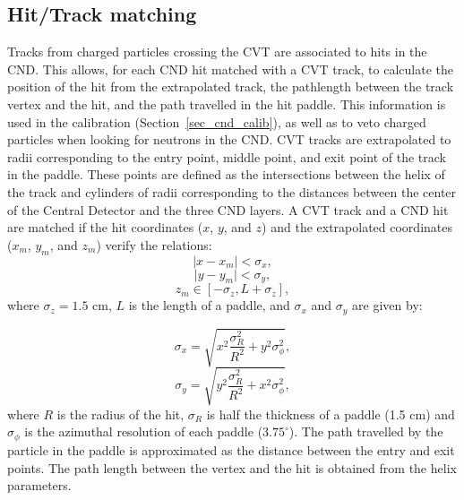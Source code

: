 \subsection{Hit/Track matching}
Tracks from charged particles crossing the CVT are associated to hits in the CND. This allows, for each CND hit matched with a CVT track, to calculate the position of the hit from the extrapolated track, the pathlength between the track vertex and the hit, and the path travelled in the hit paddle. This information is used in the calibration (Section~\ref{sec_cnd_calib}), as well as to veto charged particles when looking for neutrons in the CND. 
CVT tracks are extrapolated to radii corresponding to the entry point, middle point, and exit point of the track in the paddle. These points are defined as the intersections between the helix of the track and cylinders of radii corresponding to the distances between the center of the Central Detector and the three CND layers.
A CVT track and a CND hit are matched if the hit coordinates ($x$, $y$, and $z$) and the extrapolated coordinates ($x_{m}$, $y_{m}$, and $z_{m}$) verify the relations:
\begin{equation}
\mid x-x_{m} \mid < \sigma_x ,
\end{equation}
\begin{equation}
\mid y-y_{m} \mid < \sigma_y ,
\end{equation}
\begin{equation}
z_{m}  \in [-\sigma_z,L+\sigma_z],
\end{equation}
where $\sigma_z=1.5$ cm, $ L$ is the length of a paddle, and $\sigma_x$ and $\sigma_y$ are given by:

\begin{equation}
\sigma_x= \sqrt{x^{2}\frac{\sigma_{R}^{2}}{R^2}+y^{2}\sigma_{\phi}^{2}},
\end{equation}
\begin{equation}
\sigma_y= \sqrt{y^{2}\frac{\sigma_{R}^{2}}{R^2}+x^{2}\sigma_{\phi}^{2}},
\end{equation}
where $R$ is the radius of the hit, $\sigma_R$ is half the thickness of a paddle (1.5 cm) and $\sigma_{\phi}$ is the azimuthal resolution of each paddle ($3.75^{\circ}$).
%
The path travelled by the particle in the paddle is approximated as the distance between the entry and exit points.
%
The path length between the vertex and the hit is obtained from the helix parameters.

